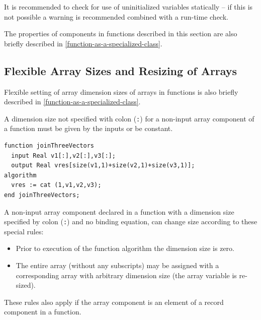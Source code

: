 \begin{nonnormative}
It is recommended to check for use of uninitialized variables statically -- if this is not possible a warning is recommended combined with a run-time check.
\end{nonnormative}

\begin{nonnormative}
The properties of components in functions described in this section are also briefly described in \cref{function-as-a-specialized-class}.
\end{nonnormative}

\subsection{Flexible Array Sizes and Resizing of Arrays}\label{flexible-array-sizes-and-resizing-of-arrays-in-functions}

\begin{nonnormative}
Flexible setting of array dimension sizes of arrays in functions is also briefly described in \cref{function-as-a-specialized-class}.
\end{nonnormative}

A dimension size not specified with colon (\lstinline!:!) for a non-input array component of a function must be given by the inputs or be constant.

\begin{example}
\begin{lstlisting}[language=modelica]
function joinThreeVectors
  input Real v1[:],v2[:],v3[:];
  output Real vres[size(v1,1)+size(v2,1)+size(v3,1)];
algorithm
  vres := cat (1,v1,v2,v3);
end joinThreeVectors;
\end{lstlisting}
\end{example}

A non-input array component declared in a function with a dimension size specified by colon (\lstinline!:!) and no binding equation, can change size according to these special rules:
\begin{itemize}
\item
  Prior to execution of the function algorithm the dimension size is zero.
\item
  The entire array (without any subscripts) may be assigned with a corresponding array with arbitrary dimension size (the array variable is re-sized).
\end{itemize}

These rules also apply if the array component is an element of a record component in a function.


